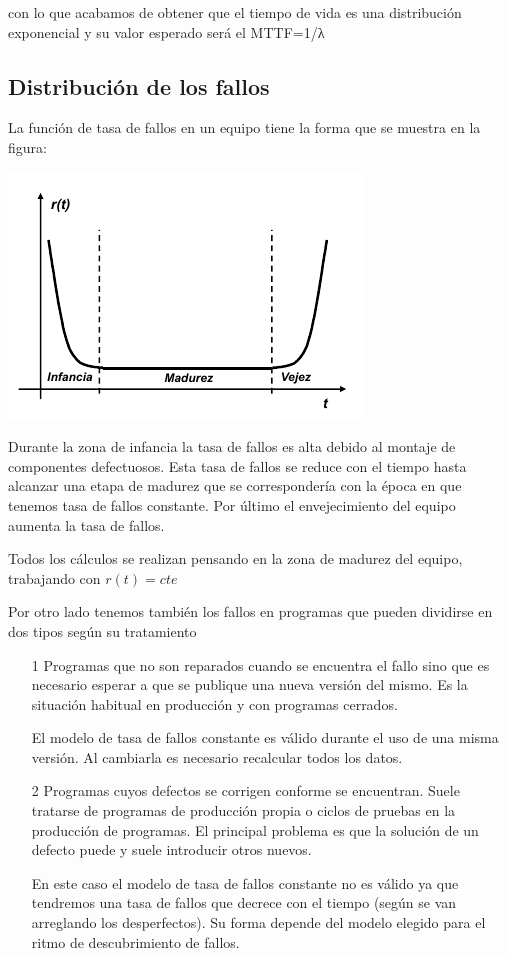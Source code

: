 con lo que acabamos de obtener que el tiempo de vida es una distribución exponencial y su valor esperado será el MTTF=1/λ

\subsection{Distribución de los fallos}

La función de tasa de fallos en un equipo tiene la forma que se muestra en la figura:
\begin{center}
\includegraphics[width=0.7\linewidth]{img/tasa_fallos.png}
\end{center}

Durante la zona de infancia la tasa de fallos es alta debido al montaje de componentes defectuosos. Esta tasa de fallos se reduce con el tiempo hasta alcanzar una etapa de madurez que se correspondería con la época en que tenemos tasa de fallos constante. Por último el envejecimiento del equipo aumenta la tasa de fallos.

Todos los cálculos se realizan pensando en la zona de madurez del equipo, trabajando con $r(t)=cte$

Por otro lado tenemos también los fallos en programas que pueden dividirse en dos tipos según su tratamiento
\begin{enumerate}
\item[1] Programas que no son reparados cuando se encuentra el fallo sino que es necesario esperar a que se publique una nueva versión del mismo. Es la situación habitual en producción y con programas cerrados.

El modelo de tasa de fallos constante es válido durante el uso de una misma versión. Al cambiarla es necesario recalcular todos los datos.

\item[2] Programas cuyos defectos se corrigen conforme se encuentran. Suele tratarse de programas de producción propia o ciclos de pruebas en la producción de programas. El principal problema es que la solución de un defecto puede y suele introducir otros nuevos.

En este caso el modelo de tasa de fallos constante no es válido ya que tendremos una tasa de fallos que decrece con el tiempo (según se van arreglando los desperfectos). Su forma depende del modelo elegido para el ritmo de descubrimiento de fallos.

\end{enumerate}

